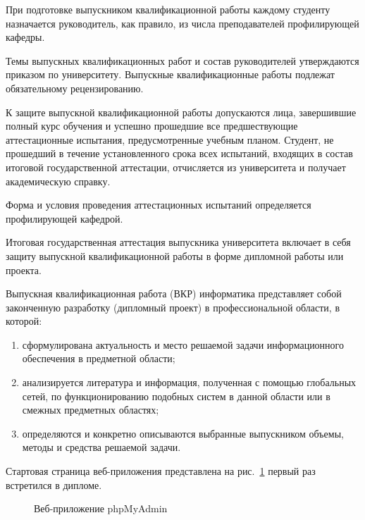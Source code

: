 \documentclass[14pt]{extarticle} %
\begin{document}
При подготовке выпускником квалификационной работы каждому студенту назначается 
руководитель, как правило, из числа преподавателей профилирующей кафедры.

Темы выпускных квалификационных работ и состав руководителей утверждаются приказом 
по университету. Выпускные квалификационные работы подлежат обязательному 
рецензированию. 

К защите выпускной квалификационной работы допускаются лица, завершившие полный курс 
обучения и успешно прошедшие все предшествующие аттестационные испытания, 
предусмотренные учебным планом. Студент, не прошедший в течение установленного 
срока всех испытаний, входящих в состав итоговой государственной аттестации, 
отчисляется из университета и получает академическую справку.




Форма и условия проведения аттестационных испытаний определяется профилирующей кафедрой.

Итоговая государственная аттестация выпускника университета включает в себя
защиту выпускной квалификационной работы в форме дипломной работы или проекта.

Выпускная квалификационная работа (ВКР) информатика 
представляет собой законченную разработку (дипломный проект) в профессиональной области, 
в которой: 
\begin{enumerate}[label=\arabic*)]
\item сформулирована актуальность и место решаемой задачи 
информационного обеспечения в предметной области;
\item анализируется литература и информация, полученная с помощью 
глобальных сетей, по функционированию подобных систем в данной области 
или в смежных предметных областях; 
\item определяются и конкретно описываются выбранные выпускником объемы, 
методы и средства решаемой задачи.
\end{enumerate}

Стартовая страница веб-приложения представлена на рис.~\ref{first} первый раз встретился в дипломе.
\begin{figure}[h]
\centering
\caption{Веб-приложение phpMyAdmin}
\label{first}
\end{figure}
\end{document}
